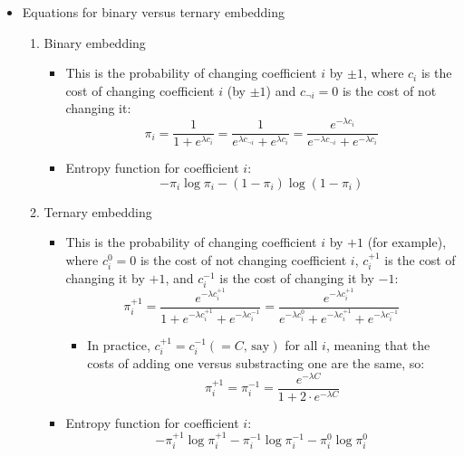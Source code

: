 \documentclass[11pt,a4paper]{report}
\begin{document}
\begin{itemize}
\item Equations for binary versus ternary embedding
  \begin{enumerate}
  \item Binary embedding
    \begin{itemize}
    \item This is the probability of changing coefficient $i$ by $\pm1$, where $c_i$ is the cost of changing coefficient $i$ (by $\pm1$) and $c_{\neg i} = 0$ is the cost of not changing it:
      \begin{equation*}
      \pi_i = \frac{1}{1+e^{\lambda c_i}} = \frac{1}{e^{\lambda c_{\neg i}}+e^{\lambda c_i}} = \frac{e^{-\lambda c_i}}{e^{-\lambda c_{\neg i}}+e^{-\lambda c_i}}
      \end{equation*}
    \item Entropy function for coefficient $i$:
      \begin{equation*}
      - \pi_i \log \pi_i - (1 - \pi_i) \log (1 - \pi_i)
      \end{equation*}
    \end{itemize}

  \item Ternary embedding
    \begin{itemize}
    \item This is the probability of changing coefficient $i$ by $+1$ (for example), where $c^0_i = 0$ is the cost of not changing coefficient $i$, $c^{+1}_i$ is the cost of changing it by $+1$, and $c^{-1}_i$ is the cost of changing it by $-1$:
    \begin{equation*}
    \pi^{+1}_i = \frac{e^{-\lambda c^{+1}_i}}{1+e^{-\lambda c^{+1}_i}+e^{-\lambda c^{-1}_i}} = \frac{e^{-\lambda c^{+1}_i}}{e^{-\lambda c^0_i}+e^{-\lambda c^{+1}_i}+e^{-\lambda c^{-1}_i}}
    \end{equation*}
      \begin{itemize}
      \item In practice, $c^{+1}_i = c^{-1}_i (= C \text{, say})$ for all $i$, meaning that the costs of adding one versus substracting one are the same, so:
      \begin{equation*}
      \pi^{+1}_i =\pi^{-1}_i =  \frac{e^{-\lambda C}}{1+2 \cdot e^{-\lambda C}}
      \end{equation*}
      \end{itemize}
    \item Entropy function for coefficient $i$:
      \begin{equation*}
      - \pi^{+1}_i \log \pi^{+1}_i - \pi^{-1}_i \log \pi^{-1}_i - \pi^0_i \log \pi^0_i
      \end{equation*}
    \end{itemize}
  \end{enumerate}


\end{itemize}
\end{document}
